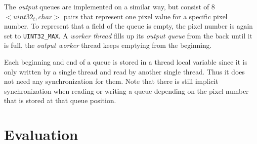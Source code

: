 The \textit{output} queues are implemented on a similar way, but consist of 8 $<uint32_t, char>$ pairs that represent one pixel value for a specific pixel number. To represent that a field of the queue is empty, the pixel number is again set to \verb$UINT32_MAX$. A \textit{worker thread} fills up its \textit{output queue} from the back until it is full, the \textit{output worker} thread keeps emptying from the beginning.

Each beginning and end of a queue is stored in a thread local variable since it is only written by a single thread and read by another single thread. Thus it does not need any synchronization for them. Note that there is still implicit synchronization when reading or writing a queue depending on the pixel number that is stored at that queue position.


\section{Evaluation}
\label{sec:Evaluation}



























